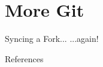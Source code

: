 %

%
\section{More Git}
\label{sec:more_git}

\begin{frame}[fragile]{Syncing a Fork...}
  ...again!
\end{frame}

%

\begin{frame}[allowframebreaks]{References}
  
  
\end{frame}


